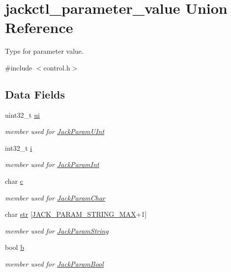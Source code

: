 \hypertarget{unionjackctl__parameter__value}{\section{jackctl\-\_\-parameter\-\_\-value \-Union \-Reference}
\label{dc/d32/unionjackctl__parameter__value}
}


\-Type for parameter value.  




{\ttfamily \#include $<$control.\-h$>$}

\subsection*{\-Data \-Fields}
\begin{DoxyCompactItemize}
\item 
uint32\-\_\-t \hyperlink{unionjackctl__parameter__value_aff0227f8e7a6959b93886febe576d0be}{ui}
\begin{DoxyCompactList}\small\item\em member used for \hyperlink{control_8h_ac71832cf5445a694a178d15345d67840a574c962072518406c2aebf6b3d6ddc71}{\-Jack\-Param\-U\-Int} \end{DoxyCompactList}\item 
int32\-\_\-t \hyperlink{unionjackctl__parameter__value_a34bd19127b1d1f1b45dd62557052ed3f}{i}
\begin{DoxyCompactList}\small\item\em member used for \hyperlink{control_8h_ac71832cf5445a694a178d15345d67840a257077c62b40f8c7c6b253c21fcaa5e6}{\-Jack\-Param\-Int} \end{DoxyCompactList}\item 
char \hyperlink{unionjackctl__parameter__value_a818569c9b5ff786af53e83607e46127c}{c}
\begin{DoxyCompactList}\small\item\em member used for \hyperlink{control_8h_ac71832cf5445a694a178d15345d67840aab44adbfbb163aa6b6ad52eac90b2bfb}{\-Jack\-Param\-Char} \end{DoxyCompactList}\item 
char \hyperlink{unionjackctl__parameter__value_a3d696c7c7ceea1cdca2a215b4e01dcbb}{str} \mbox{[}\hyperlink{control_8h_a582463bb97200e584edaa215180e16d4}{\-J\-A\-C\-K\-\_\-\-P\-A\-R\-A\-M\-\_\-\-S\-T\-R\-I\-N\-G\-\_\-\-M\-A\-X}+1\mbox{]}
\begin{DoxyCompactList}\small\item\em member used for \hyperlink{control_8h_ac71832cf5445a694a178d15345d67840aabd8d7557b32d28d8bc7c22449a74b0b}{\-Jack\-Param\-String} \end{DoxyCompactList}\item 
bool \hyperlink{unionjackctl__parameter__value_a9765ef8c57c7b9993c645e985cc4a75d}{b}
\begin{DoxyCompactList}\small\item\em member used for \hyperlink{control_8h_ac71832cf5445a694a178d15345d67840a766feed3831809abe9b67872086f241f}{\-Jack\-Param\-Bool} \end{DoxyCompactList}\end{DoxyCompactItemize}


